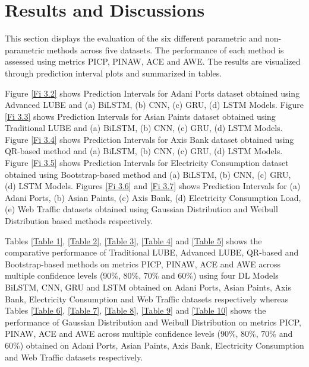 \section{ Results and Discussions}

This section displays the evaluation of the six different parametric and non-parametric methods across five datasets. The performance of each method is assessed using metrics PICP, PINAW, ACE and AWE. The results are visualized through prediction interval plots and summarized in tables.

Figure \ref{Fi 3.2} shows Prediction Intervals for Adani Ports dataset obtained using Advanced LUBE and (a) BiLSTM, (b) CNN, (c) GRU, (d) LSTM Models.
Figure \ref{Fi 3.3} shows Prediction Intervals for Asian Paints dataset obtained using Traditional LUBE and (a) BiLSTM, (b) CNN, (c) GRU, (d) LSTM Models.
Figure \ref{Fi 3.4} shows Prediction Intervals for Axis Bank dataset obtained using QR-based method and (a) BiLSTM, (b) CNN, (c) GRU, (d) LSTM Models.
Figure \ref{Fi 3.5} shows Prediction Intervals for Electricity Consumption dataset obtained using Bootstrap-based method and (a) BiLSTM, (b) CNN, (c) GRU, (d) LSTM Models.
Figures \ref{Fi 3.6} and \ref{Fi 3.7} shows Prediction Intervals for (a) Adani Ports, (b) Asian Paints, (c) Axis Bank, (d) Electricity Consumption Load, (e) Web Traffic datasets obtained using Gaussian Distribution and Weibull Distribution based methods respectively.

Tables \ref{Table 1}, \ref{Table 2}, \ref{Table 3}, \ref{Table 4} and \ref{Table 5} shows the comparative performance of Traditional LUBE, Advanced LUBE, QR-based and Bootstrap-based methods on metrics PICP, PINAW, ACE and AWE across multiple confidence levels (90\%, 80\%, 70\% and 60\%) using four DL Models BiLSTM, CNN, GRU and LSTM obtained on Adani Ports, Asian Paints, Axis Bank, Electricity Consumption and Web Traffic datasets respectively whereas Tables \ref{Table 6}, \ref{Table 7}, \ref{Table 8}, \ref{Table 9} and \ref{Table 10} shows the performance of Gaussian Distribution and Weibull Distribution on metrics PICP, PINAW, ACE and AWE across multiple confidence levels (90\%, 80\%, 70\% and 60\%) obtained on Adani Ports, Asian Paints, Axis Bank, Electricity Consumption and Web Traffic datasets respectively.


